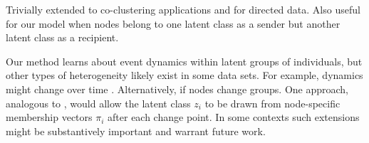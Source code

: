 Trivially extended to co-clustering applications and for directed data.
Also useful for our model when nodes belong to one latent class as a sender but another latent class as a recipient.

Our method learns about event dynamics within latent groups of individuals, but other types of heterogeneity likely exist in some data sets.
For example, dynamics might change over time \cite{Vu2011}.
Alternatively, if nodes change groups.
One approach, analogous to \cite{Airoldi2008}, would allow the latent class $z_i$ to be drawn from node-specific membership vectors $\pi_i$  after each change point.
In some contexts such extensions might be substantively important and warrant future work.
